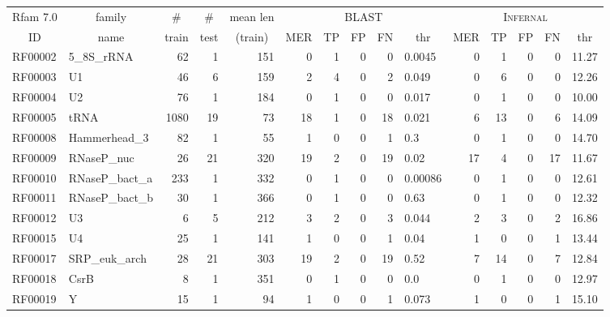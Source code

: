 \documentclass[11pt]{article}
\begin{document}
\begin{table}
\scriptsize
\begin{center}
\begin{tabular}{|ll|rrr|rrrrl|rrrrr|} \hline
\multicolumn{1}{|c}{Rfam 7.0} & \multicolumn{1}{c|}{family} & \multicolumn{1}{c}{\#} & \multicolumn{1}{c}{\#} & \multicolumn{1}{c}{mean len} & \multicolumn{5}{|c|}{\textsc{BLAST}} & \multicolumn{5}{|c|}{\textsc{Infernal}} \\ 
\multicolumn{1}{|c}{ID} & \multicolumn{1}{c|}{name} & \multicolumn{1}{c}{train} & \multicolumn{1}{c}{test} & \multicolumn{1}{c|}{(train)} & \multicolumn{1}{c}{MER} & \multicolumn{1}{c}{TP} & \multicolumn{1}{c}{FP} & \multicolumn{1}{c}{FN} & \multicolumn{1}{c|}{thr} & \multicolumn{1}{c}{MER} & \multicolumn{1}{c}{TP} & \multicolumn{1}{c}{FP} & \multicolumn{1}{c}{FN} & \multicolumn{1}{c|}{thr} \\ \hline 
RF00002 & 5\_8S\_rRNA & 62 & 1 & 151 & 0 & 1 & 0 & 0 & 0.0045 & 0 & 1 & 0 & 0 &  11.27 \\  
RF00003 & U1 & 46 & 6 & 159 & 2 & 4 & 0 & 2 &  0.049 & 0 & 6 & 0 & 0 &  12.26 \\  
RF00004 & U2 & 76 & 1 & 184 & 0 & 1 & 0 & 0 &  0.017 & 0 & 1 & 0 & 0 &     10.00 \\  
RF00005 & tRNA & 1080 & 19 & 73 & 18 & 1 & 0 & 18 &  0.021 & 6 & 13 & 0 & 6 &  14.09 \\  
RF00008 & Hammerhead\_3 & 82 & 1 & 55 & 1 & 0 & 0 & 1 &    0.3 & 0 & 1 & 0 & 0 &   14.70 \\  
RF00009 & RNaseP\_nuc & 26 & 21 & 320 & 19 & 2 & 0 & 19 &   0.02 & 17 & 4 & 0 & 17 &  11.67 \\  
RF00010 & RNaseP\_bact\_a & 233 & 1 & 332 & 0 & 1 & 0 & 0 & 0.00086 & 0 & 1 & 0 & 0 &  12.61 \\  
RF00011 & RNaseP\_bact\_b & 30 & 1 & 366 & 0 & 1 & 0 & 0 &   0.63 & 0 & 1 & 0 & 0 &  12.32 \\  
RF00012 & U3 & 6 & 5 & 212 & 3 & 2 & 0 & 3 &  0.044 & 2 & 3 & 0 & 2 &  16.86 \\  
RF00015 & U4 & 25 & 1 & 141 & 1 & 0 & 0 & 1 &   0.04 & 1 & 0 & 0 & 1 &  13.44 \\  
RF00017 & SRP\_euk\_arch & 28 & 21 & 303 & 19 & 2 & 0 & 19 &   0.52 & 7 & 14 & 0 & 7 &  12.84 \\  
RF00018 & CsrB & 8 & 1 & 351 & 0 & 1 & 0 & 0 &      0.0 & 0 & 1 & 0 & 0 &  12.97 \\  
RF00019 & Y & 15 & 1 & 94 & 1 & 0 & 0 & 1 &  0.073 & 1 & 0 & 0 & 1 &   15.10 \\  

\end{tabular}
\end{center}
\end{table}
\end{document}
